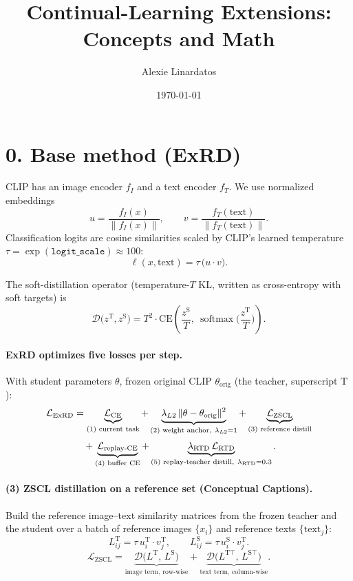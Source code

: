 \documentclass[11pt]{article}
\title{Continual-Learning Extensions: Concepts and Math}
\author{Alexie Linardatos}
\date{\today}
\newcommand{\teach}{\mathrm{T}}
\newcommand{\stud}{\mathrm{S}}
\newcommand{\softmax}{\operatorname{softmax}}
\begin{document}
\maketitle

\section*{0. Base method (ExRD)}

CLIP has an image encoder $f_I$ and a text encoder $f_T$. We use normalized embeddings
\[
u = \frac{f_I(x)}{\lVert f_I(x)\rVert}, \qquad
v = \frac{f_T(\text{text})}{\lVert f_T(\text{text})\rVert}.
\]
Classification logits are cosine similarities scaled by CLIP's learned temperature
$\tau = \exp(\texttt{logit\_scale}) \approx 100$:
\[
\ell(x,\text{text}) = \tau \, \big(u \cdot v\big).
\]

The soft-distillation operator (temperature-$T$ KL, written as cross-entropy with soft targets) is
\[
\mathcal{D}\big(z^{\teach}, z^{\stud}\big)
= T^2 \cdot \mathrm{CE}\!\left(\frac{z^{\stud}}{T},\ \softmax\!\Big(\frac{z^{\teach}}{T}\Big)\right).
\]

\paragraph{ExRD optimizes five losses per step.}
With student parameters $\theta$, frozen original CLIP $\theta_{\text{orig}}$ (the teacher, superscript $\teach$):
\begin{align}
\mathcal{L}_{\text{ExRD}}
&= \underbrace{\mathcal{L}_{\text{CE}}}_{\text{(1) current task}}
+ \underbrace{\lambda_{L2}\,\lVert \theta - \theta_{\text{orig}} \rVert^2}_{\text{(2) weight anchor},\ \lambda_{L2}=1}
+ \underbrace{\mathcal{L}_{\text{ZSCL}}}_{\text{(3) reference distill}} \notag\\[2pt]
&\quad
+ \underbrace{\mathcal{L}_{\text{replay-CE}}}_{\text{(4) buffer CE}}
+ \underbrace{\lambda_{\text{RTD}}\,\mathcal{L}_{\text{RTD}}}_{\text{(5) replay-teacher distill},\ \lambda_{\text{RTD}}=0.3}.
\end{align}

\paragraph{(3) ZSCL distillation on a reference set (Conceptual Captions).}
Build the reference image--text similarity matrices from the frozen teacher and the student
over a batch of reference images $\{x_i\}$ and reference texts $\{\text{text}_j\}$:
\[
L^{\teach}_{ij} = \tau\, u^{\teach}_i \cdot v^{\teach}_j,
\qquad
L^{\stud}_{ij} = \tau\, u^{\stud}_i \cdot v^{\teach}_j .
\]
\[
\mathcal{L}_{\text{ZSCL}}
= \underbrace{\mathcal{D}\big(L^{\teach},\, L^{\stud}\big)}_{\text{image term, row-wise}}
+ \underbrace{\mathcal{D}\big(L^{\teach\top},\, L^{\stud\top}\big)}_{\text{text term, column-wise}} .
\]
\end{document}

